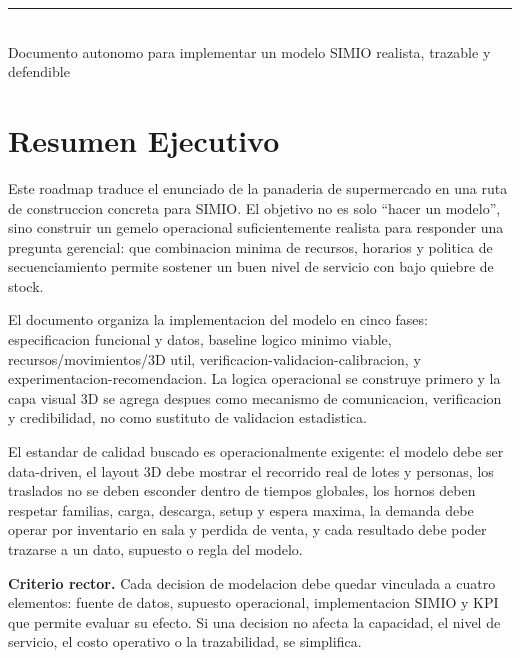 \documentclass[12pt]{article}
\begin{document}
\begin{titlepage}
\vfill
{\color{azulppal}\rule{\linewidth}{2.5pt}}\\[0.3em]
{\small\color{grisoscuro} Documento autonomo para implementar un modelo SIMIO realista, trazable y defendible}
\end{titlepage}

\tableofcontents
\newpage

\section{Resumen Ejecutivo}

Este roadmap traduce el enunciado de la panaderia de supermercado en una ruta de construccion concreta para SIMIO. El objetivo no es solo ``hacer un modelo'', sino construir un gemelo operacional suficientemente realista para responder una pregunta gerencial: que combinacion minima de recursos, horarios y politica de secuenciamiento permite sostener un buen nivel de servicio con bajo quiebre de stock.

El documento organiza la implementacion del modelo en cinco fases: especificacion funcional y datos, baseline logico minimo viable, recursos/movimientos/3D util, verificacion-validacion-calibracion, y experimentacion-recomendacion. La logica operacional se construye primero y la capa visual 3D se agrega despues como mecanismo de comunicacion, verificacion y credibilidad, no como sustituto de validacion estadistica.

El estandar de calidad buscado es operacionalmente exigente: el modelo debe ser data-driven, el layout 3D debe mostrar el recorrido real de lotes y personas, los traslados no se deben esconder dentro de tiempos globales, los hornos deben respetar familias, carga, descarga, setup y espera maxima, la demanda debe operar por inventario en sala y perdida de venta, y cada resultado debe poder trazarse a un dato, supuesto o regla del modelo.

\begin{center}
\colorbox{grisclaro}{%
\parbox{0.92\textwidth}{%
\textbf{Criterio rector.} Cada decision de modelacion debe quedar vinculada a cuatro elementos: fuente de datos, supuesto operacional, implementacion SIMIO y KPI que permite evaluar su efecto. Si una decision no afecta la capacidad, el nivel de servicio, el costo operativo o la trazabilidad, se simplifica.
}}
\end{center}
\end{document}
